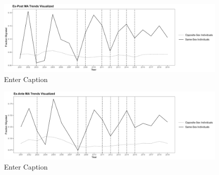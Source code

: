 \documentclass[12pt,letterpaper]{article}
\begin{document}
\begin{figure}
    \centering
    \includegraphics[width=0.75\linewidth]{outputs/summary_stats/MA_post_trends.png}
    \caption{Enter Caption}
    \label{fig: MA_post_trends}
\end{figure}

\begin{figure}
    \centering
    \includegraphics[width=0.75\linewidth]{outputs/summary_stats/MA_ante_trends.png}
    \caption{Enter Caption}
    \label{fig: MA_ante_trends}
\end{figure}
\end{document}
